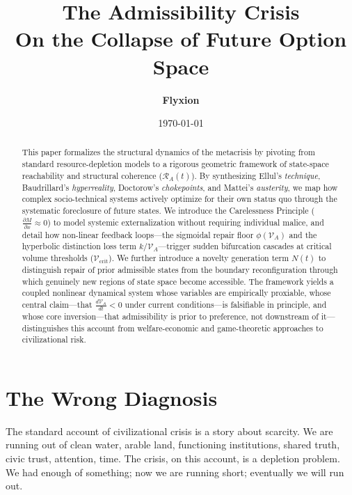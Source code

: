 \documentclass[11pt, letterpaper]{article}
\title{\textbf{The Admissibility Crisis}\\[0.4em]
  \large\normalfont On the Collapse of Future Option Space}
\author{\textbf{Flyxion}}
\date{\today}
\begin{document}
\maketitle
\thispagestyle{empty}

\begin{abstract}
This paper formalizes the structural dynamics of the metacrisis by pivoting from standard resource-depletion models to a rigorous geometric framework of state-space reachability and structural coherence ($\mathcal{R}_A(t)$). By synthesizing Ellul's \textit{technique}, Baudrillard's \textit{hyperreality}, Doctorow's \textit{chokepoints}, and Mattei's \textit{austerity}, we map how complex socio-technical systems actively optimize for their own status quo through the systematic foreclosure of future states. We introduce the Carelessness Principle ($\frac{\partial M}{\partial x} \approx 0$) to model systemic externalization without requiring individual malice, and detail how non-linear feedback loops---the sigmoidal repair floor $\phi(\mathcal{V}_A)$ and the hyperbolic distinction loss term $k/\mathcal{V}_A$---trigger sudden bifurcation cascades at critical volume thresholds ($\mathcal{V}_{\text{crit}}$). We further introduce a novelty generation term $N(t)$ to distinguish repair of prior admissible states from the boundary reconfiguration through which genuinely new regions of state space become accessible. The framework yields a coupled nonlinear dynamical system whose variables are empirically proxiable, whose central claim---that $\frac{d\mathcal{V}_A}{dt} < 0$ under current conditions---is falsifiable in principle, and whose core inversion---that admissibility is prior to preference, not downstream of it---distinguishes this account from welfare-economic and game-theoretic approaches to civilizational risk.
\end{abstract}

\newpage

\section{The Wrong Diagnosis}

The standard account of civilizational crisis is a story about scarcity. We are running out of clean water, arable land, functioning institutions, shared truth, civic trust, attention, time. The crisis, on this account, is a depletion problem. We had enough of something; now we are running short; eventually we will run out.
\end{document}
